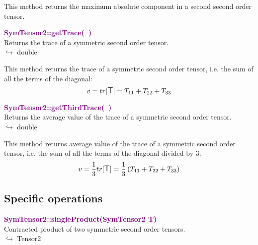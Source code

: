 This method returns the maximum absolute component in a second second order tensor.

\textcolor{purple}{\textbf{SymTensor2::getTrace(~)}}\label{SymTensor2::getTrace()}\\
Returns the trace of a symmetric second order tensor.\\ \hspace*{10mm}$\hookrightarrow$ double

  This method returns the trace of a symmetric second order tensor, i.e. the sum of all the terms of the diagonal:
\begin{equation*}
v = tr[\mbox{\large\ensuremath{\mathsf{T}}}] = T_{11}+T_{22}+T_{33}
\end{equation*}

\textcolor{purple}{\textbf{SymTensor2::getThirdTrace(~)}}\label{SymTensor2::getThirdTrace()}\\
Returns the average value of the trace of a symmetric second order tensor.\\ \hspace*{10mm}$\hookrightarrow$ double

This method returns average value of the trace of a symmetric second order tensor, i.e. the sum of all the terms of the diagonal divided by 3:
\begin{equation*}
v = \frac{1}{3} tr[\mbox{\large\ensuremath{\mathsf{T}}}] =  \frac{1}{3} \left( T_{11}+T_{22}+T_{33} \right)
\end{equation*}

\subsection{Specific operations}

\textcolor{purple}{\textbf{SymTensor2::singleProduct(SymTensor2 T)}}\label{SymTensor2::singleProduct(SymTensor2 T)}\\
Contracted product of two symmetric second order tensors.\\ \hspace*{10mm}$\hookrightarrow$ Tensor2

